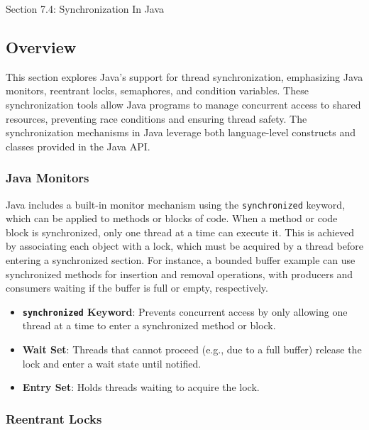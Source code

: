 \begin{notes}{Section 7.4: Synchronization In Java}
    \subsection*{Overview}

    This section explores Java's support for thread synchronization, emphasizing Java monitors, reentrant locks, semaphores, and condition variables. These synchronization tools allow Java programs 
    to manage concurrent access to shared resources, preventing race conditions and ensuring thread safety. The synchronization mechanisms in Java leverage both language-level constructs and classes 
    provided in the Java API.
    
    \subsubsection*{Java Monitors}
    
    Java includes a built-in monitor mechanism using the \texttt{synchronized} keyword, which can be applied to methods or blocks of code. When a method or code block is synchronized, only one thread 
    at a time can execute it. This is achieved by associating each object with a lock, which must be acquired by a thread before entering a synchronized section. For instance, a bounded buffer example 
    can use synchronized methods for insertion and removal operations, with producers and consumers waiting if the buffer is full or empty, respectively.
    
    \begin{highlight}
    
        \begin{itemize}
            \item \textbf{\texttt{synchronized} Keyword}: Prevents concurrent access by only allowing one thread at a time to enter a synchronized method or block.
            \item \textbf{Wait Set}: Threads that cannot proceed (e.g., due to a full buffer) release the lock and enter a wait state until notified.
            \item \textbf{Entry Set}: Holds threads waiting to acquire the lock.
        \end{itemize}
    
    \end{highlight}
    
    \subsubsection*{Reentrant Locks}
    

\end{notes}

